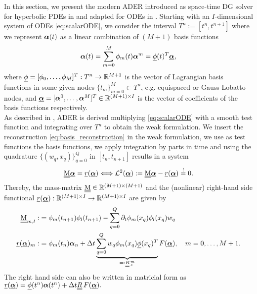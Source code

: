 In this section, we present the modern ADER introduced as space-time DG solver for hyperbolic PDEs in \cite{ADERModern} and adapted for ODEs in \cite{Han_Veiga_2021,veiga2023improving}. Starting with an $I$-dimensional system of ODEs \eqref{eq:scalarODE}, we consider the interval $T^n:=[t^n,t^{n+1}]$ where we represent $\boldsymbol{\alpha}(t)$ as a linear combination of $(M+1)$ basis functions
\begin{equation}\label{eq:basis_reconstruction}
\boldsymbol{\alpha}(t) = \sum_{m=0}^M \phi_m(t)\boldsymbol{\alpha}^m = \underline{\phi}(t)^T\underline{\boldsymbol{\alpha}},
\end{equation}
where 
$\underline{\phi} = [ \phi_0, \dots , \phi_M ]^T:T^n\to \mathbb R^{M+1}$ is the vector of Lagrangian basis functions in some given nodes $\{t_m\}_{m=0}^M\subset T^n$, e.g. equispaced or Gauss-Lobatto nodes, and $\underline{\boldsymbol{\alpha}}=[ \boldsymbol{\alpha}^0, \dots, \boldsymbol{\alpha}^M]^T \in \mathbb R^{(M+1)\times I}$ is the vector of coefficients of the basis functions respectively. \\
As described in \cite{Han_Veiga_2021}, ADER is derived multiplying \eqref{eq:scalarODE} with a smooth test function and integrating over $T^n$ to obtain the weak formulation. We insert the reconstruction \eqref{eq:basis_reconstruction} in the weak formulation, we use as test functions the basis functions, we apply integration by parts in time and using the quadrature $\lbrace (w_q, x_q)\rbrace_{q=0}^Q$ in $[t_n,t_{n+1}]$ results in a system
\begin{equation}\label{eq:ADER_fix_point}
\underline{\underline{\mathrm{M}}} \underline{\boldsymbol{\alpha}} = \underline{r}(\underline{\boldsymbol{\alpha}}) \Longleftrightarrow \mathcal{L}^2(\underline{\boldsymbol{\alpha}}):=\underline{\underline{\mathrm{M}}}\underline{\boldsymbol{\alpha}}-\underline{r}(\underline{\boldsymbol{\alpha}})\stackrel{!}{=}0.
\end{equation}
Thereby, the mass-matrix $\underline{\underline{\mathrm{M}}} \in \mathbb R^{(M+1)\times(M+1)}$ and the (nonlinear) right-hand side functional $\underline{r}(\underline{\boldsymbol{\alpha}}):\mathbb R^{(M+1)\times I}\to \mathbb R^{(M+1)\times I}$ are given by
\begin{align}\label{eq:MassmatrixAder}
\M_{m,l} :&= \phi_m(t_{n+1})\phi_l(t_{n+1})- \sum_{q=0}^Q \partial_t \phi_m(x_q) \phi_l(x_q) w_q\\
\label{eq:aderrhsMatrix}
\vec{r}(\bbc)_m:&=\phi_m(t_{n})\bc_n
+ \Delta t \underbrace{\sum_{q=0}^{Q} w_q \phi_m(x_q) \bphi(x_q)^T}_{=:\mat{R}^m_z} F(\bbc) , \quad m=0,\dots,M+1.
\end{align}
The right hand side can also be written in matricial form as $\vec{r}(\bbc) = \vec{\phi}(t^{n})\bc(t^n) + \Delta t \mat{R} F(\bbc).$
